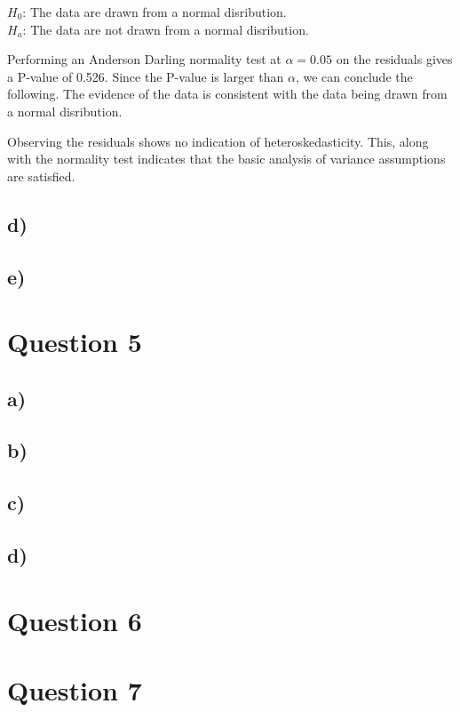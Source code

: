\documentclass{article}
\begin{document}
\begin{flushleft}
$H_0$: The data are drawn from a normal disribution. \\
$H_a$: The data are not drawn from a normal disribution. \\
\end{flushleft}
Performing an Anderson Darling normality test at $\alpha = 0.05$ on the residuals gives a P-value of 0.526.
Since the P-value is larger than $\alpha$, we can conclude the following. 
The evidence of the data is consistent with the data being drawn from a normal disribution.

Observing the residuals shows no indication of heteroskedasticity. This, along with the normality test indicates that the
basic analysis of variance assumptions are satisfied.
\subsection*{d)}
\subsection*{e)}

\clearpage
\section*{Question 5}
\subsection*{a)}
\subsection*{b)}
\subsection*{c)}
\subsection*{d)}

\clearpage
\section*{Question 6}

\clearpage
\section*{Question 7}
\end{document}
